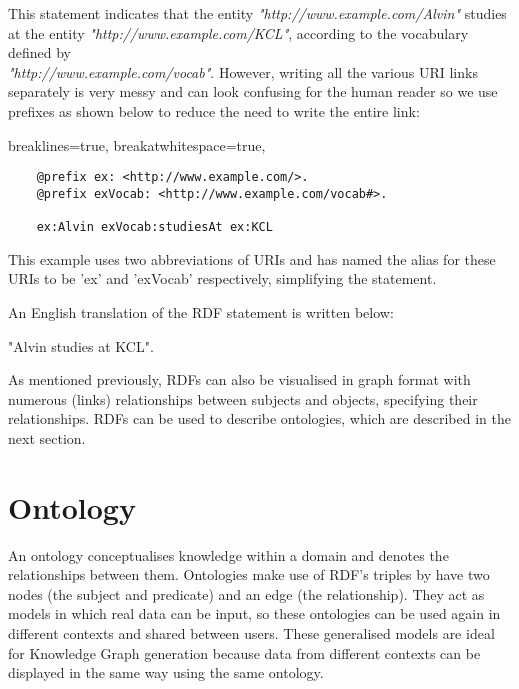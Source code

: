 This statement indicates that the entity \textit{"http://www.example.com/Alvin"} studies at the entity \textit{"http://www.example.com/KCL"}, according to the vocabulary defined by \\\textit{"http://www.example.com/vocab"}. However, writing all the various URI links separately is very messy and can look confusing for the human reader so we use prefixes as shown below to reduce the need to write the entire link:

\lstset
{
    breaklines=true,
    breakatwhitespace=true,
}
\begin{center}
\begin{lstlisting}
    @prefix ex: <http://www.example.com/>. 
    @prefix exVocab: <http://www.example.com/vocab#>. 

    ex:Alvin exVocab:studiesAt ex:KCL
\end{lstlisting}
\end{center} 

This example uses two abbreviations of URIs and has named the alias for these URIs to be 'ex' and 'exVocab' respectively, simplifying the statement. 

An English translation of the RDF statement is written below: 

\begin{center}
    "Alvin studies at KCL". 
\end{center}

As mentioned previously, RDFs can also be visualised in graph format with numerous (links) relationships between subjects and objects, specifying their relationships. RDFs can be used to describe ontologies, which are described in the next section.

\section{Ontology}
\hspace{0.5cm} An ontology conceptualises knowledge within a domain and denotes the relationships between them. \cite{ontology} Ontologies make use of RDF's triples by have two nodes (the subject and predicate) and an edge (the relationship). They act as models in which real data can be input, so these ontologies can be used again in different contexts and shared between users. These generalised models are ideal for Knowledge Graph generation because data from different contexts can be displayed in the same way using the same ontology. 

